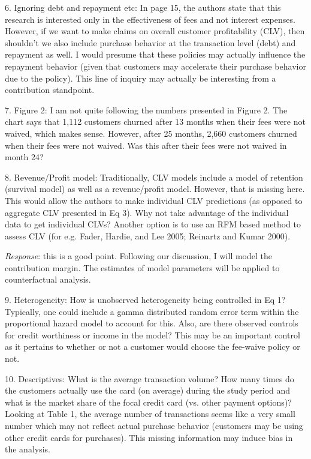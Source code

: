 \documentclass[titlepage,12pt,letterpaper]{article}
\numberwithin{equation}{section}
\begin{document}
6.	Ignoring debt and repayment etc: In page 15, the authors state that this research is interested only in the effectiveness of fees and not interest expenses. However, if we want to make claims on overall customer profitability (CLV), then shouldn't we also include purchase behavior at the transaction level (debt) and repayment as well. I would presume that these policies may actually influence the repayment behavior (given that customers may accelerate their purchase behavior due to the policy). This line of inquiry may actually be interesting from a contribution standpoint.

7.	Figure 2: I am not quite following the numbers presented in Figure 2. The chart says that 1,112 customers churned after 13 months when their fees were not waived, which makes sense. However, after 25 months, 2,660 customers churned when their fees were not waived. Was this after their fees were not waived in month 24?

8.	Revenue/Profit model: Traditionally, CLV models include a model of retention (survival model) as well as a revenue/profit model. However, that is missing here. This would allow the authors to make individual CLV predictions (as opposed to aggregate CLV presented in Eq 3). Why not take advantage of the individual data to get individual CLVs? Another option is to use an RFM based method to assess CLV (for e.g. Fader, Hardie, and Lee 2005; Reinartz and Kumar 2000).

\emph{Response}: this is a good point. Following our discussion, I will model the contribution margin. The estimates of model parameters will be applied to counterfactual analysis.  

9.	Heterogeneity: How is unobserved heterogeneity being controlled in Eq 1? Typically, one could include a gamma distributed random error term within the proportional hazard model to account for this. Also, are there observed controls for credit worthiness or income in the model? This may be an important control as it pertains to whether or not a customer would choose the fee-waive policy or not.

10.	Descriptives: What is the average transaction volume? How many times do the customers actually use the card (on average) during the study period and what is the market share of the focal credit card (vs. other payment options)? Looking at Table 1, the average number of transactions seems like a very small number which may not reflect actual purchase behavior (customers may be using other credit cards for purchases). This missing information may induce bias in the analysis.
\end{document}

